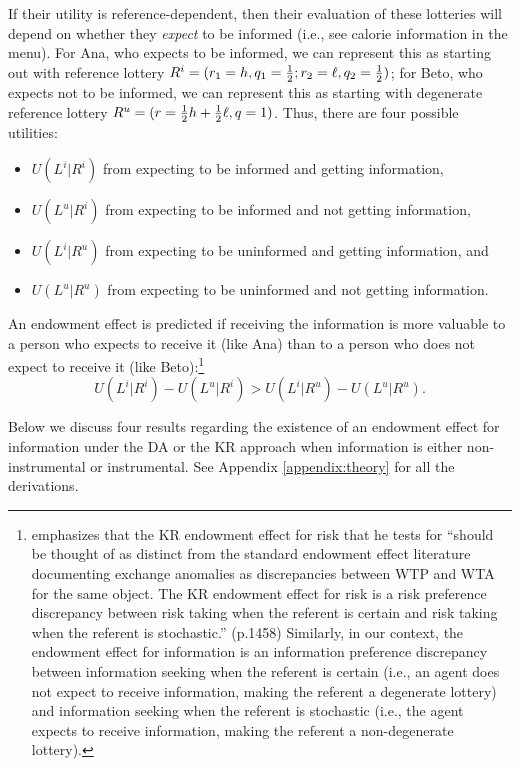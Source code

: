 If their utility is reference-dependent, then their evaluation of these lotteries will depend on whether they \emph{expect} to be informed (i.e., see calorie information in the menu). For Ana, who expects to be informed, we can represent this as starting out with reference lottery $R^i=(r_1=h,q_1=\tfrac{1}{2};r_2=\ell,q_2=\tfrac{1}{2})$; for Beto, who expects not to be informed, we can represent this as starting with degenerate reference lottery $R^u=(r=\tfrac{1}{2} h + \tfrac{1}{2} \ell,q=1)$. Thus, there are four possible utilities:
\begin{itemize}
	\item $U(L^i|R^i)$ from expecting to be informed and getting information,
	\item $U(L^u|R^i)$ from expecting to be informed and not getting information,
	\item $U(L^i|R^u)$ from expecting to be uninformed and getting information, and
  \item $U(L^u|R^u)$ from expecting to be uninformed and not getting information.
\end{itemize}

An endowment effect is predicted if receiving the information is more valuable to a person who expects to receive it (like Ana) than to a person who does not expect to receive it (like Beto):\footnote{\citet{sprengerEndowmentEffectRisk2015} emphasizes that the KR endowment effect for risk that he tests for \enquote{should be thought of as distinct from the standard endowment effect literature documenting exchange anomalies as discrepancies between WTP and WTA for the same object. The KR endowment effect for risk is a risk preference discrepancy between risk taking when the referent is certain and risk taking when the referent is stochastic.} (p.1458) Similarly, in our context, the endowment effect for information is an information preference discrepancy between information seeking when the referent is certain (i.e., an agent does not expect to receive information, making the referent a degenerate lottery) and information seeking when the referent is stochastic (i.e., the agent expects to receive information, making the referent a non-degenerate lottery).}
\begin{equation}
  U(L^i|R^i)-U(L^u|R^i)>U(L^i|R^u)-U(L^u|R^u).
  \label{eq:endowmentEffect}
\end{equation}

Below we discuss four results regarding the existence of an endowment effect for information under the DA or the KR approach when information is either non-instrumental or instrumental. See Appendix \ref{appendix:theory} for all the derivations.

